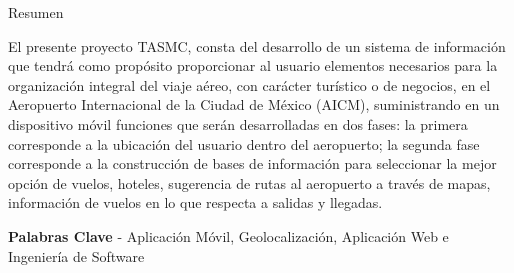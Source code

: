 \vspace{0.8cm}

\centerline{\Large Resumen}

El presente proyecto TASMC, consta del desarrollo de un sistema de información que tendrá como propósito proporcionar al usuario elementos necesarios para la organización integral del viaje aéreo, con carácter turístico o de negocios, en el Aeropuerto Internacional de la Ciudad de México (AICM), suministrando en un dispositivo móvil funciones que serán desarrolladas en dos fases: la primera corresponde a la ubicación del usuario dentro del aeropuerto; la segunda fase corresponde a la construcción de bases de información para seleccionar la mejor opción  de vuelos, hoteles, sugerencia de rutas al aeropuerto a través de mapas, información de vuelos en lo que respecta a salidas y llegadas.

\vspace{0.2cm}

\centerline{\textbf{Palabras Clave }- Aplicación Móvil, Geolocalización, Aplicación Web e Ingeniería de Software}